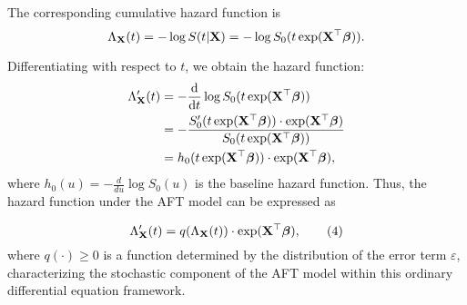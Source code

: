 The corresponding cumulative hazard function is
\begin{equation*}
	\Lambda_{\mathbf{X}}(t) = -\log S(t|\mathbf{X}) = -\log S_0(t \exp(\mathbf{X}^\top \boldsymbol{\beta})).
\end{equation*}

Differentiating with respect to \( t \), we obtain the hazard function:
\begin{equation*}
	\begin{aligned}
		\Lambda_{\mathbf{X}}'(t) & = - \frac{\mathop{}\!\mathrm{d}}{\mathop{}\!\mathrm{d} t} \log S_0(t \exp(\mathbf{X}^\top \boldsymbol{\beta}))                                              \\
		                   & = - \frac{S_0'(t \exp(\mathbf{X}^\top \boldsymbol{\beta})) \cdot \exp(\mathbf{X}^\top \boldsymbol{\beta})}{S_0(t \exp(\mathbf{X}^\top \boldsymbol{\beta}))} \\
		                   & = h_0(t \exp(\mathbf{X}^\top \boldsymbol{\beta})) \cdot \exp(\mathbf{X}^\top \boldsymbol{\beta}),
	\end{aligned}
\end{equation*}
where \( h_0(u) = -\frac{d}{du} \log S_0(u) \) is the baseline hazard function. Thus, the hazard function under the AFT model can be expressed as

\begin{equation}
	\Lambda_{\mathbf{X}}'(t) = q(\Lambda_{\mathbf{X}}(t)) \cdot \exp(\mathbf{X}^\top \boldsymbol{\beta}), \tag{4}
\end{equation}
where \( q(\cdot) \geq 0 \) is a function determined by the distribution of the error term \( \varepsilon \), characterizing the stochastic component of the AFT model within this ordinary differential equation framework.
